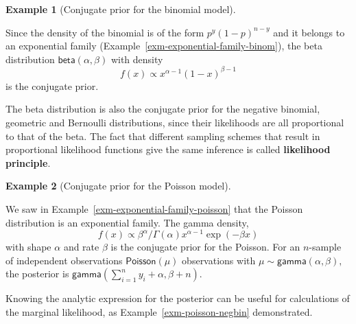 \documentclass[
  11pt,
  letterpaper,
]{scrbook}
\theoremstyle{definition}
\newtheorem{example}{Example}[chapter]
\theoremstyle{plain}
\theoremstyle{plain}
\theoremstyle{plain}
\theoremstyle{definition}
\theoremstyle{definition}
\theoremstyle{plain}
\theoremstyle{plain}
\theoremstyle{remark}
\begin{document}
\begin{example}[Conjugate prior for the binomial
model]\protect\hypertarget{exm-conjugatepriors-binom}{}\label{exm-conjugatepriors-binom}

Since the density of the binomial is of the form \(p^y(1-p)^{n-y}\) and
it belongs to an exponential family
(Example~\ref{exm-exponential-family-binom}), the beta distribution
\(\mathsf{beta}(\alpha, \beta)\) with density
\[f(x) \propto x^{\alpha-1} (1-x)^{\beta-1}\] is the conjugate prior.

The beta distribution is also the conjugate prior for the negative
binomial, geometric and Bernoulli distributions, since their likelihoods
are all proportional to that of the beta. The fact that different
sampling schemes that result in proportional likelihood functions give
the same inference is called \textbf{likelihood principle}.

\end{example}

\begin{example}[Conjugate prior for the Poisson
model]\protect\hypertarget{exm-conjugatepriors-poisson}{}\label{exm-conjugatepriors-poisson}

We saw in Example~\ref{exm-exponential-family-poisson} that the Poisson
distribution is an exponential family. The gamma density,
\[ f(x) \propto \beta^{\alpha}/\Gamma(\alpha)x^{\alpha-1} \exp(-\beta x)\]
with shape \(\alpha\) and rate \(\beta\) is the conjugate prior for the
Poisson. For an \(n\)-sample of independent observations
\(\mathsf{Poisson}(\mu)\) observations with
\(\mu \sim \mathsf{gamma}(\alpha, \beta),\) the posterior is
\(\mathsf{gamma}(\sum_{i=1}^n y_i + \alpha, \beta + n).\)

\end{example}

Knowing the analytic expression for the posterior can be useful for
calculations of the marginal likelihood, as
Example~\ref{exm-poisson-negbin} demonstrated.
\end{document}
